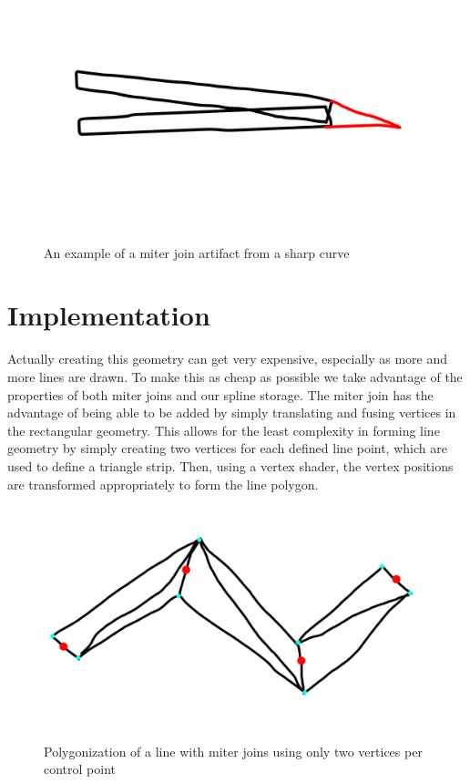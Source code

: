 \documentclass[12pt]{report}
\begin{document}
\begin{figure}
\includegraphics[width=\textwidth]{miterartifact.jpg}
\caption{An example of a miter join artifact from a sharp curve}
\end{figure}

\section{Implementation}

Actually creating this geometry can get very expensive, especially as more and more lines are drawn. 
To make this as cheap as possible we take advantage of the properties of both miter joins and our spline storage.
The miter join has the advantage of being able to be added by simply translating and fusing vertices in the rectangular geometry. 
This allows for the least complexity in forming line geometry by simply creating two vertices for each defined line point, which are used to define a triangle strip. 
Then, using a vertex shader, the vertex positions are transformed appropriately to form the line polygon.

\begin{figure}
	\includegraphics[width=\textwidth]{miterpolys.jpg}
	\caption{Polygonization of a line with miter joins using only two vertices per control point}
\end{figure}
\end{document}
